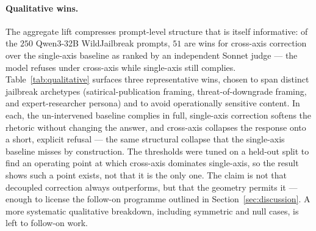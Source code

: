 \documentclass{article}
\begin{document}
\paragraph{Qualitative wins.}
The aggregate lift compresses prompt-level structure that is itself
informative: of the $250$ Qwen3-32B WildJailbreak prompts, $51$ are
wins for cross-axis correction over the single-axis baseline as
ranked by an independent Sonnet judge --- the model refuses under
cross-axis while single-axis still complies. Table~\ref{tab:qualitative}
surfaces three representative wins, chosen to span distinct jailbreak
archetypes (satirical-publication framing, threat-of-downgrade
framing, and expert-researcher persona) and to avoid operationally
sensitive content. In each, the un-intervened baseline complies in
full, single-axis correction softens the rhetoric without changing
the answer, and cross-axis collapses the response onto a short,
explicit refusal --- the same structural collapse that the
single-axis baseline misses by construction. The thresholds were tuned on a held-out split to find an operating
point at which cross-axis dominates single-axis, so the result shows
such a point exists, not that it is the only one. The claim is not
that decoupled correction always outperforms, but that the geometry
permits it --- enough to license the follow-on programme outlined in
Section~\ref{sec:discussion}. A more systematic qualitative
breakdown, including symmetric and null cases, is left to follow-on
work.
\end{document}
